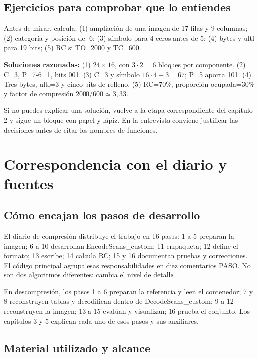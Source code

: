 \documentclass[11pt,a4paper,oneside]{report}
\begin{document}
\section{Ejercicios para comprobar que lo entiendes}

Antes de mirar, calcula: (1) ampliación de una imagen de 17 filas y 9 columnas;
(2) categoría y posición de -6; (3) símbolo para 4 ceros antes de 5;
(4) bytes y ultl para 19 bits; (5) RC si TO=2000 y TC=600.

\textbf{Soluciones razonadas:} (1) $24\times16$, con $3\cdot2=6$ bloques
por componente. (2) C=3, P=7-6=1, bits 001. (3) C=3 y símbolo $16\cdot4+3=67$;
P=5 aporta 101. (4) Tres bytes, ultl=3 y cinco bits de relleno.
(5) RC=70\%, proporción ocupada=30\% y factor de compresión $2000/600\simeq3,33$.

Si no puedes explicar una solución, vuelve a la etapa correspondiente del
capítulo 2 y sigue un bloque con papel y lápiz. En la entrevista conviene
justificar las decisiones antes de citar los nombres de funciones.


\chapter{Correspondencia con el diario y fuentes}
\section{Cómo encajan los pasos de desarrollo}

El diario de compresión distribuye el trabajo en 16 pasos: 1 a 5 preparan
la imagen; 6 a 10 desarrollan EncodeScans\_custom; 11 empaqueta; 12 define
el formato; 13 escribe; 14 calcula RC; 15 y 16 documentan pruebas y correcciones.
El código principal agrupa esas responsabilidades en diez comentarios PASO.
No son dos algoritmos diferentes: cambia el nivel de detalle.

En descompresión, los pasos 1 a 6 preparan la referencia y leen el contenedor;
7 y 8 reconstruyen tablas y decodifican dentro de DecodeScans\_custom;
9 a 12 reconstruyen la imagen; 13 a 15 evalúan y visualizan; 16 prueba el conjunto.
Los capítulos 3 y 5 explican cada uno de esos pasos y sus auxiliares.


\section{Material utilizado y alcance}
\end{document}
